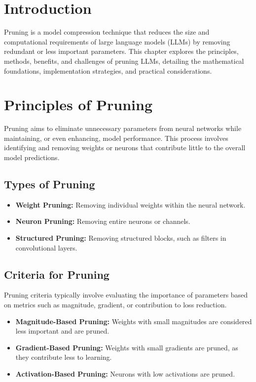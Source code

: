 \section{Introduction}
Pruning is a model compression technique that reduces the size and computational requirements of large language models (LLMs) by removing redundant or less important parameters. This chapter explores the principles, methods, benefits, and challenges of pruning LLMs, detailing the mathematical foundations, implementation strategies, and practical considerations.

\section{Principles of Pruning}
Pruning aims to eliminate unnecessary parameters from neural networks while maintaining, or even enhancing, model performance. This process involves identifying and removing weights or neurons that contribute little to the overall model predictions.

\subsection{Types of Pruning}
\begin{itemize}
    \item \textbf{Weight Pruning:} Removing individual weights within the neural network.
    \item \textbf{Neuron Pruning:} Removing entire neurons or channels.
    \item \textbf{Structured Pruning:} Removing structured blocks, such as filters in convolutional layers.
\end{itemize}

\subsection{Criteria for Pruning}
Pruning criteria typically involve evaluating the importance of parameters based on metrics such as magnitude, gradient, or contribution to loss reduction.

\begin{itemize}
    \item \textbf{Magnitude-Based Pruning:} Weights with small magnitudes are considered less important and are pruned.
    \item \textbf{Gradient-Based Pruning:} Weights with small gradients are pruned, as they contribute less to learning.
    \item \textbf{Activation-Based Pruning:} Neurons with low activations are pruned.
\end{itemize}

